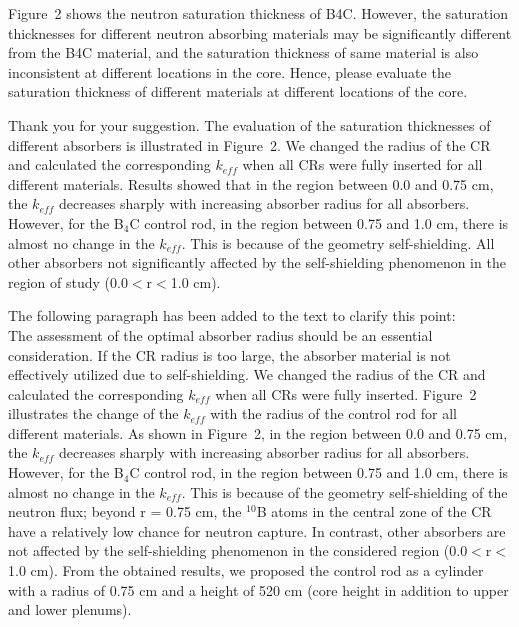 \documentclass[answers,11pt]{exam}
\begin{document}
\begin{questions}
\begin{solution}
	
	
	\end{solution}

	\question Figure~2 shows the neutron saturation thickness of B4C. However, the saturation thicknesses for different neutron absorbing materials may be significantly different from the B4C material, and the saturation thickness of same material is also inconsistent at different locations in the core. Hence, please evaluate the saturation thickness of different materials at different locations of the core.
\begin{solution}
	
 	 Thank you for your suggestion. The evaluation of the saturation thicknesses of different absorbers is illustrated in Figure~2. 	
	 We changed the radius of the CR and calculated the corresponding $k_{eff}$ when all CRs were fully inserted for all different materials. Results showed that in the region between 0.0 and 0.75 cm, the $k_{eff}$ decreases sharply with increasing absorber radius for all absorbers. However, for the B$_4$C control rod, in the region between 0.75 and 1.0 cm, there is almost no change in the $k_{eff}$. This is because of the geometry self-shielding. All other absorbers not significantly affected by the self-shielding phenomenon in the region of study (0.0$<$r$<$1.0 cm). 
	 
	 The following paragraph has been added to the text to clarify this point:\\
	
     The assessment of the optimal absorber radius should be an essential consideration. If the CR radius is too large, the absorber material is not effectively utilized due to self-shielding. We changed the radius of the CR and calculated the corresponding $k_{eff}$ when all CRs were fully inserted. Figure~2 illustrates the change of the $k_{eff}$ with the radius of the control rod for all different materials. As shown in Figure~2, in the region between 0.0 and 0.75 cm, the $k_{eff}$ decreases sharply with increasing absorber radius for all absorbers. However, for the B$_4$C control rod, in the region between 0.75 and 1.0 cm, there is almost no change in the $k_{eff}$. This is because of the geometry self-shielding of the neutron flux; beyond r = 0.75 cm, the $^{10}$B atoms in the central zone of the CR have a relatively low chance for neutron capture. In contrast, other absorbers are not affected by the self-shielding phenomenon in the considered region (0.0$<$r$<$1.0 cm). From the obtained results, we proposed the control rod as a cylinder with a radius of 0.75 cm and a height of 520 cm (core height in addition to upper and lower plenums).
	 

\end{solution}
\end{questions}
\end{document}
